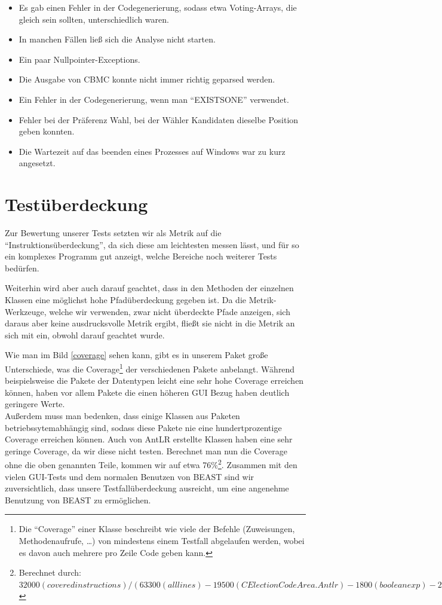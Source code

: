 \documentclass[a4paper]{scrreprt}
\begin{document}
\begin{itemize}
  \item Es gab einen Fehler in der Codegenerierung, sodass etwa Voting-Arrays, die gleich sein sollten, unterschiedlich waren.
  \item In manchen Fällen ließ sich die Analyse nicht starten.
  \item Ein paar Nullpointer-Exceptions.
  \item Die Ausgabe von CBMC konnte nicht immer richtig geparsed werden.
  \item Ein Fehler in der Codegenerierung, wenn man "`EXISTSONE"' verwendet.
  \item Fehler bei der Präferenz Wahl, bei der Wähler Kandidaten dieselbe
  Position geben konnten.
  \item Die Wartezeit auf das beenden eines Prozesses auf Windows war zu kurz
  angesetzt.
\end{itemize}


\section{Testüberdeckung}
Zur Bewertung unserer Tests setzten wir als Metrik auf die
"`Instruktionsüberdeckung"', da sich diese am leichtesten messen lässt, und für
so ein komplexes Programm gut anzeigt, welche Bereiche noch weiterer Tests
bedürfen.

Weiterhin wird aber auch darauf geachtet, dass in den Methoden der einzelnen Klassen eine möglichst hohe
Pfadüberdeckung gegeben ist. Da die Metrik-Werkzeuge, welche wir verwenden, zwar
nicht überdeckte Pfade anzeigen, sich daraus aber keine ausdrucksvolle Metrik ergibt, fließt sie nicht in die Metrik an sich mit ein, obwohl darauf
geachtet wurde.
\newline

Wie man im Bild \ref{coverage} sehen kann, gibt es in unserem Paket große
Unterschiede, was die Coverage\footnote{Die "`Coverage"' einer Klasse beschreibt
wie viele der Befehle (Zuweisungen, Methodenaufrufe, \ldots ) von mindestens einem
Testfall abgelaufen werden, wobei es davon auch mehrere pro Zeile Code geben kann.} der verschiedenen Pakete anbelangt.
Während beispielsweise die Pakete der Datentypen leicht eine sehr hohe Coverage
erreichen können, haben vor allem Pakete die einen höheren GUI Bezug haben
deutlich geringere Werte. \\
Außerdem muss man bedenken, dass einige Klassen aus Paketen
betriebssytemabhängig sind, sodass diese Pakete nie eine hundertprozentige Coverage
erreichen können. Auch von AntLR erstellte Klassen haben eine sehr geringe
Coverage, da wir diese nicht testen.
\newline
Berechnet man nun die Coverage ohne die oben genannten Teile, kommen wir auf etwa
76\%\footnote{Berechnet durch: $32000 (covered instructions) / (63300 (all
lines) - 19500 (CElectionCodeArea.Antlr) - 1800 (booleanexp) - 200)
(LinuxProcess)$}.
Zusammen mit den vielen GUI-Tests und dem normalen Benutzen von BEAST sind
wir zuversichtlich, dass unsere Testfallüberdeckung ausreicht, um eine
angenehme Benutzung von BEAST zu ermöglichen.
\end{document}
